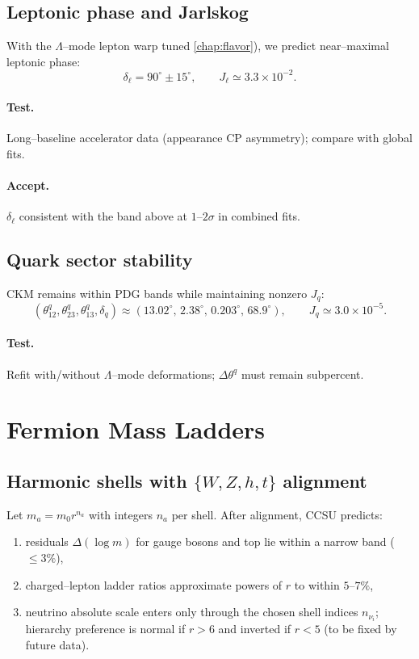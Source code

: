 \subsection{Leptonic phase and Jarlskog}
With the \(\Lambda\)--mode lepton warp tuned \ref{chap:flavor}), we predict near–maximal leptonic phase:
\begin{equation}
\delta_\ell = 90^\circ \pm 15^\circ,\qquad
J_\ell \simeq 3.3\times 10^{-2}.
\end{equation}
\paragraph{Test.} Long–baseline accelerator data (appearance CP asymmetry); compare with global fits.
\paragraph{Accept.} \(\delta_\ell\) consistent with the band above at \(1\)–\(2\sigma\) in combined fits.

\subsection{Quark sector stability}
CKM remains within PDG bands while maintaining nonzero \(J_q\):
\begin{equation}
(\theta_{12}^q,\theta_{23}^q,\theta_{13}^q,\delta_q)
\approx (13.02^\circ,\,2.38^\circ,\,0.203^\circ,\,68.9^\circ),\qquad
J_q\simeq 3.0\times 10^{-5}.
\end{equation}
\paragraph{Test.} Refit with/without \(\Lambda\)--mode deformations; \(\Delta\theta^q\) must remain subpercent.

\section{Fermion Mass Ladders}

\subsection{\texorpdfstring{Harmonic shells with $\{W,Z,h,t\}$ alignment}{Harmonic shells with \{W,Z,h,t\} alignment}}
Let \(m_a=m_0 r^{n_a}\) with integers \(n_a\) per shell. After alignment, CCSU predicts:
\begin{enumerate}
  \item residuals \(\Delta(\log m)\) for gauge bosons and top lie within a narrow band (\(\le 3\%\)),
  \item charged–lepton ladder ratios approximate powers of \(r\) to within \(5\)–\(7\%\),
  \item neutrino absolute scale enters only through the chosen shell indices \(n_{\nu_i}\); hierarchy preference is normal if \(r>6\) and inverted if \(r<5\) (to be fixed by future data).
\end{enumerate}
